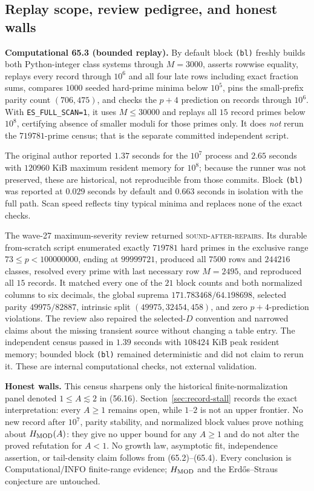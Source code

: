 \documentclass[10pt,reqno]{amsart}
\theoremstyle{definition}
\newcommand{\1}{\mathbf 1}
\begin{document}
\subsection{Replay scope, review pedigree, and honest walls}
\medskip\noindent\textbf{Computational 65.3 (bounded replay).}
By default block \texttt{(bl)} freshly builds both Python-integer class
systems through $M=3000$, asserts rowwise equality, replays every record
through $10^6$ and all four late rows including exact fraction sums, compares
$1000$ seeded hard-prime minima below $10^5$, pins the small-prefix parity
count $(706,475)$, and checks the $p+4$ prediction on records through
$10^6$.  With \texttt{ES\_FULL\_SCAN=1}, it uses $M\leq30000$ and replays
all $15$ record primes below $10^8$, certifying absence of smaller moduli for
those primes only.  It does \emph{not} rerun the $719781$-prime census; that
is the separate committed independent script.

The original author reported $1.37$ seconds for the $10^7$ process and
$2.65$ seconds with $120960$ KiB maximum resident memory for $10^8$; because
the runner was not preserved, these are historical, not reproducible from
those commits.  Block \texttt{(bl)} was reported at $0.029$ seconds by
default and $0.663$ seconds in isolation with the full path.  Scan speed
reflects tiny typical minima and replaces none of the exact checks.

The wave-27 maximum-severity review returned
\textsc{sound-after-repairs}.  Its durable from-scratch script enumerated
exactly $719781$ hard primes in the exclusive range
$73\leq p<100000000$, ending at $99999721$, produced all $7500$ rows and
$244216$ classes, resolved every prime with last necessary row $M=2495$,
and reproduced all $15$ records.  It matched every one of the $21$ block
counts and both normalized columns to six decimals, the global suprema
$171.783468/64.198698$, selected parity $49975/82887$, intrinsic split
$(49975,32454,458)$, and zero $p+4$-prediction violations.  The review also
repaired the selected-$D$ convention and narrowed claims about the missing
transient source without changing a table entry.  The independent census
passed in $1.39$ seconds with $108424$ KiB peak resident memory; bounded
block \texttt{(bl)} remained deterministic and did not claim to rerun it.
These are internal computational checks, not external validation.

\medskip\noindent\textbf{Honest walls.}
This census sharpens only the historical finite-normalization panel denoted
$1\leq A\lesssim2$ in (56.16).  Section~\ref{sec:record-stall} records the
exact interpretation: every $A\geq1$ remains open, while $1$--$2$ is not an
upper frontier.  No new record after $10^7$, parity stability, and normalized
block values prove nothing about $H_{\rm MOD}(A)$: they give no upper bound
for any $A\geq1$ and do not alter the proved refutation for $A<1$.  No growth law, asymptotic fit, independence assertion, or tail-density
claim follows from (65.2)--(65.4).  Every conclusion is
Computational/INFO finite-range evidence; $H_{\rm MOD}$ and the
Erd\H{o}s--Straus conjecture are untouched.
\end{document}
